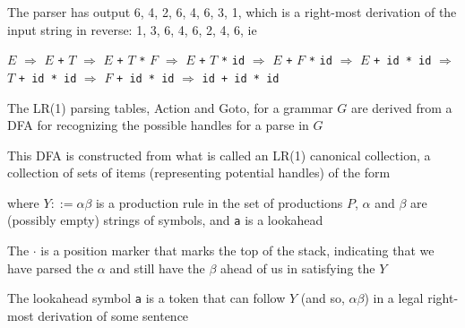 \documentclass[8pt,a4paper,compress,handout]{beamer}
\newcommand{\mm}[1]{$#1$}
\newenvironment{spaced}
{
\smallskip
\hspace{.5cm}
\begin{minipage}[c]{\textwidth}
}
{
\end{minipage}
\smallskip
}
\begin{document}
\begin{frame}[fragile]
\pause

The parser has output 6, 4, 2, 6, 4, 6, 3, 1, which is a right-most derivation of the input string in reverse: 1, 3, 6, 4, 6, 2, 4, 6, ie

\text{ }
\begin{spaced}
\begin{production}
\underline{\mm{E}} \mm{\Rightarrow} \mm{E} \lstinline{+} \underline{\mm{T}}
   \mm{\Rightarrow} \mm{E} \lstinline{+} \mm{T} \lstinline{*} \underline{\mm{F}}
   \mm{\Rightarrow} \mm{E} \lstinline{+} \underline{\mm{T}} \lstinline{*} \lstinline{id}
   \mm{\Rightarrow} \mm{E} \lstinline{+} \underline{\mm{F}} \lstinline{*} \lstinline{id}
   \mm{\Rightarrow} \underline{\mm{E}} \lstinline{+ id * id}
   \mm{\Rightarrow} \underline{\mm{T}} \lstinline{+ id * id}
   \mm{\Rightarrow} \underline{\mm{F}} \lstinline{+ id * id}
   \mm{\Rightarrow} \lstinline{id + id * id}
\end{production}
\end{spaced}
\end{frame}

\begin{frame}[fragile]
\pause

The LR(1) parsing tables, Action and Goto, for a grammar $G$ are derived from a DFA for recognizing the possible handles for a parse in $G$

\pause
\bigskip

This DFA is constructed from what is called an LR(1) canonical collection, a collection of sets of items (representing potential handles) of the form

\text{ }
\begin{spaced}
\begin{production}
[Y ::= \mm{\alpha \cdot \beta}, \lstinline{a}]
\end{production}
\end{spaced}

\noindent where $Y ::= \alpha \beta$ is a production rule in the set of productions $P$, $\alpha$ and $\beta$ are (possibly empty) strings of symbols, and \lstinline{a} is a lookahead

\pause
\bigskip

The $\cdot$ is a position marker that marks the top of the stack, indicating that we have parsed the $\alpha$ and still have the $\beta$ ahead of us in satisfying the $Y$

\pause
\bigskip

The lookahead symbol \lstinline{a} is a token that can follow $Y$ (and so, $\alpha \beta$) in a legal right-most derivation of some sentence
\end{frame}
\end{document}
